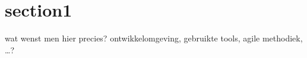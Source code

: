 \section{section1}

\begin{tcolorbox}[colback=yellow!30]
  wat wenst men hier precies?  ontwikkelomgeving, gebruikte tools, agile methodiek, \dots ?

\end{tcolorbox}


